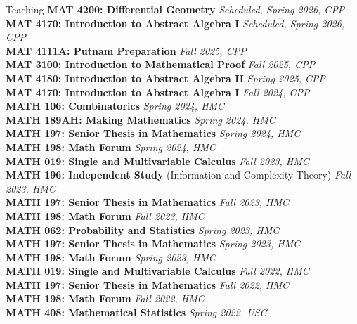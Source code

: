 \documentclass{cv} %
\begin{document}
\begin{rSection}{Teaching}
  \textbf{MAT 4200: Differential Geometry} \hfill \textit{Scheduled, Spring 2026, CPP}\\
  \textbf{MAT 4170: Introduction to Abstract Algebra I} \hfill \textit{Scheduled, Spring 2026, CPP}\\
  \textbf{MAT 4111A: Putnam Preparation} \hfill \textit{Fall 2025, CPP}\\
  \textbf{MAT 3100: Introduction to Mathematical Proof} \hfill \textit{Fall 2025, CPP}\\
  \textbf{MAT 4180: Introduction to Abstract Algebra II} \hfill \textit{Spring 2025, CPP}\\
  \textbf{MAT 4170: Introduction to Abstract Algebra I} \hfill \textit{Fall 2024, CPP}\\
  \textbf{MATH 106: Combinatorics} \hfill \textit{Spring 2024, HMC}\\
  \textbf{MATH 189AH: Making Mathematics} \hfill \textit{Spring 2024, HMC}\\
  \textbf{MATH 197: Senior Thesis in Mathematics} \hfill \textit{Spring 2024, HMC}\\
  \textbf{MATH 198: Math Forum} \hfill \textit{Spring 2024, HMC}\\
  \textbf{MATH 019: Single and Multivariable Calculus} \hfill \textit{Fall 2023, HMC}\\
  \textbf{MATH 196: Independent Study} (Information and Complexity Theory) \hfill \textit{Fall 2023, HMC}\\
  \textbf{MATH 197: Senior Thesis in Mathematics} \hfill \textit{Fall 2023, HMC}\\
  \textbf{MATH 198: Math Forum} \hfill \textit{Fall 2023, HMC}\\
  \textbf{MATH 062: Probability and Statistics} \hfill \textit{Spring 2023, HMC}\\
  \textbf{MATH 197: Senior Thesis in Mathematics} \hfill \textit{Spring 2023, HMC}\\
  \textbf{MATH 198: Math Forum} \hfill \textit{Spring 2023, HMC}\\
  \textbf{MATH 019: Single and Multivariable Calculus} \hfill \textit{Fall 2022, HMC}\\
  \textbf{MATH 197: Senior Thesis in Mathematics} \hfill \textit{Fall 2022, HMC}\\
  \textbf{MATH 198: Math Forum} \hfill \textit{Fall 2022, HMC}\\
  \textbf{MATH 408: Mathematical Statistics} \hfill \textit{Spring 2022, USC} \\

\end{rSection}
\end{document}
